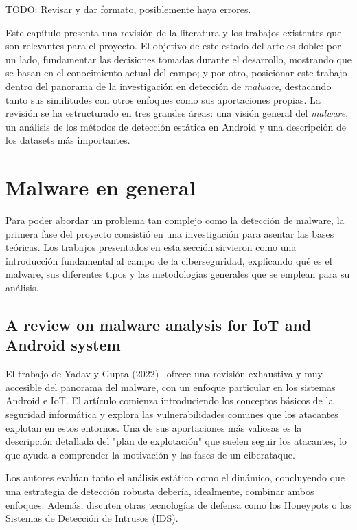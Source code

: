 
TODO: Revisar y dar formato, posiblemente haya errores.

Este capítulo presenta una revisión de la literatura y los trabajos existentes que son relevantes para el proyecto. El objetivo de este estado del arte es doble: por un lado, fundamentar las decisiones tomadas durante el desarrollo, mostrando que se basan en el conocimiento actual del campo; y por otro, posicionar este trabajo dentro del panorama de la investigación en detección de \textit{malware}, destacando tanto sus similitudes con otros enfoques como sus aportaciones propias. La revisión se ha estructurado en tres grandes áreas: una visión general del \textit{malware}, un análisis de los métodos de detección estática en Android y una descripción de los datasets más importantes.

\section{Malware en general}

Para poder abordar un problema tan complejo como la detección de malware, la primera fase del proyecto consistió en una investigación para asentar las bases teóricas. Los trabajos presentados en esta sección sirvieron como una introducción fundamental al campo de la ciberseguridad, explicando qué es el malware, sus diferentes tipos y las metodologías generales que se emplean para su análisis.

\subsection{A review on malware analysis for IoT and Android system}

El trabajo de Yadav y Gupta (2022)~\cite{yadav2022review} ofrece una revisión exhaustiva y muy accesible del panorama del malware, con un enfoque particular en los sistemas Android e IoT. El artículo comienza introduciendo los conceptos básicos de la seguridad informática y explora las vulnerabilidades comunes que los atacantes explotan en estos entornos. Una de sus aportaciones más valiosas es la descripción detallada del "plan de explotación" que suelen seguir los atacantes, lo que ayuda a comprender la motivación y las fases de un ciberataque.

Los autores evalúan tanto el análisis estático como el dinámico, concluyendo que una estrategia de detección robusta debería, idealmente, combinar ambos enfoques. Además, discuten otras tecnologías de defensa como los Honeypots o los Sistemas de Detección de Intrusos (IDS).

